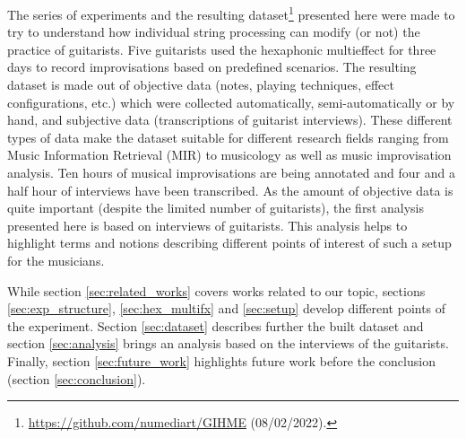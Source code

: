 \documentclass{article}
\begin{document}
The series of experiments and the resulting dataset\footnote{\url{https://github.com/numediart/GIHME} (08/02/2022).} presented here were made to try to understand how individual string processing can modify (or not) the practice of guitarists.  Five guitarists used the hexaphonic multieffect for three days to record improvisations based on predefined scenarios.
The resulting dataset is made out of objective data (notes, playing techniques, effect configurations, etc.) which were collected automatically, semi-automatically or by hand, and subjective data (transcriptions of guitarist interviews).  These different types of data make the dataset suitable for different research fields ranging from Music Information Retrieval (MIR) to musicology as well as music improvisation analysis. Ten hours of musical improvisations are being annotated and four and a half hour of interviews have been transcribed. As the amount of objective data is quite important (despite the limited number of guitarists), the first analysis presented here is based on interviews of guitarists. This analysis helps to highlight terms and notions describing different points of interest of such a setup for the musicians. 



While section \ref{sec:related_works} covers works related to our topic, sections \ref{sec:exp_structure}, \ref{sec:hex_multifx} and \ref{sec:setup} develop different points of the experiment. Section \ref{sec:dataset} describes further the built dataset and section \ref{sec:analysis} brings an analysis based on the interviews of the guitarists.
Finally, section \ref{sec:future_work} highlights future work before the conclusion (section \ref{sec:conclusion}).

\end{document}
